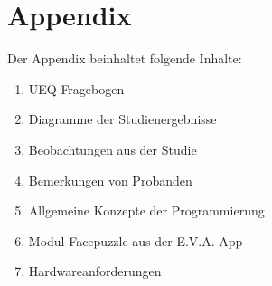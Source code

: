 \section{Appendix}
Der Appendix beinhaltet folgende Inhalte:
\begin{enumerate}
    \item UEQ-Fragebogen
    \item Diagramme der Studienergebnisse
    \item Beobachtungen aus der Studie
    \item Bemerkungen von Probanden
    \item Allgemeine Konzepte der Programmierung 
    \item Modul Facepuzzle aus der E.V.A. App
    \item Hardwareanforderungen
\end{enumerate} 
\newpage
